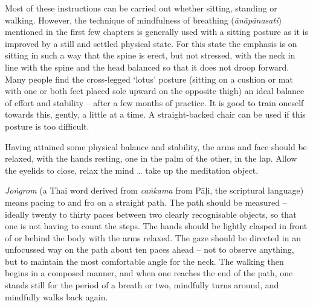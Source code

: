 
Most of these instructions can be carried out whether sitting, standing or walking. However, the technique of mindfulness of breathing (\textit{ānāpānasati}) mentioned in the first few chapters is generally used with a sitting posture as it is improved by a still and settled physical state. For this state the emphasis is on sitting in such a way that the spine is erect, but not stressed, with the neck in line with the spine and the head balanced so that it does not droop forward. Many people find the cross-legged `lotus' posture (sitting on a cushion or mat with one or both feet placed sole upward on the opposite thigh) an ideal balance of effort and stability -- after a few months of practice. It is good to train oneself towards this, gently, a little at a time. A straight-backed chair can be used if this posture is too difficult.

Having attained some physical balance and stability, the arms and face should be relaxed, with the hands resting, one in the palm of the other, in the lap. Allow the eyelids to close, relax the mind \ldots{} take up the meditation object.

\textit{Joṅgrom} (a Thai word derived from \textit{caṅkama} from Pāḷi, the scriptural language) means pacing to and fro on a straight path. The path should be measured -- ideally twenty to thirty paces between two clearly recognisable objects, so that one is not having to count the steps. The hands should be lightly clasped in front of or behind the body with the arms relaxed. The gaze should be directed in an unfocussed way on the path about ten paces ahead -- not to observe anything, but to maintain the most comfortable angle for the neck. The walking then begins in a composed manner, and when one reaches the end of the path, one stands still for the period of a breath or two, mindfully turns around, and mindfully walks back again.


